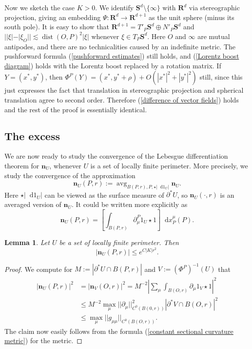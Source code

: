 \documentclass[reqno,10pt]{amsart}
\newcommand{\RR}{\mathbf{R}}
\newcommand{\Sph}{\mathbf S}
\DeclareMathOperator{\avg}{avg}
\newcommand*\dif{\mathop{}\!\mathrm{d}}
\DeclareMathOperator{\dist}{dist}
\newcommand{\normal}{\mathbf n}
\newtheorem{lemma}[theorem]{Lemma}
\theoremstyle{definition}
\numberwithin{equation}{section}
\begin{document}
Now we sketch the case $K > 0$.
We identify $\Sph^d \setminus \{\infty\}$ with $\RR^d$ via stereographic projection, giving an embedding $\Psi: \RR^d \to \RR^{d + 1}$ as the unit sphere (minus its south pole).
It is easy to show that $\RR^{d + 1} = T'_P \Sph^d \oplus N'_P \Sph^d$ and $||\xi| - |\xi_O|| \lesssim \dist(O, P)^2 |\xi|$ whenever $\xi \in T_P \Sph^d$.
Here $O$ and $\infty$ are mutual antipodes, and there are no technicalities caused by an indefinite metric.
The pushforward formula (\ref{pushforward estimates}) still holds, and (\ref{Lorentz boost diagram}) holds with the Lorentz boost replaced by a rotation matrix.
If $Y = (x^*, y^*)$, then $\Phi^P(Y) = (x^*, y^* + \rho) + O(|x^*|^2 + |y^*|^2)$ still, since this just expresses the fact that translation in stereographic projection and spherical translation agree to second order.
Therefore (\ref{difference of vector fields}) holds and the rest of the proof is essentially identical.


\subsection{The excess}
We are now ready to study the convergence of the Lebesgue differentiation theorem for $\normal_U$, whenever $U$ is a set of locally finite perimeter.
More precisely, we study the convergence of the approximation
$$\normal_U(P, r) := \avg_{B(P, r), P, \star |\dif 1_U|} \normal_U.$$
Here $\star |\dif 1_U|$ can be viewed as the surface measure of $\partial^* U$, so $\normal_U(\cdot, r)$ is an averaged version of $\normal_U$.
It could be written more explicitly as
$$\normal_U(P, r) = \left[\int_{B(P, r)} \partial_\mu^P 1_U \star 1\right] \dif x_P^\mu(P).$$

\begin{lemma}\label{gauge invariance of the normal}
Let $U$ be a set of locally finite perimeter. Then
$$|\normal_U(P, r)| \leq e^{C|K|r^2}.$$
\end{lemma}
\begin{proof}
We compute for $M := |\partial^* U \cap B(P, r)|$ and $V := (\Phi^P)^{-1}(U)$ that
\begin{align*}
|\normal_U(P, r)|^2 &= |\normal_V(O, r)|^2 = M^{-2} \left|\sum_\mu \int_{B(O, r)} \partial_\mu 1_V \star 1\right|^2 \\
&\leq M^{-2} \max_\mu ||\partial_\mu||_{C^0(B(0, r))}^2 |\partial^* V \cap B(O, r)|^2 \\
&\leq \max_\mu ||g_{\mu\mu}||_{C^0(B(O, r))}.
\end{align*}
The claim now easily follows from the formula (\ref{constant sectional curvature metric}) for the metric.
\end{proof}
\end{document}
